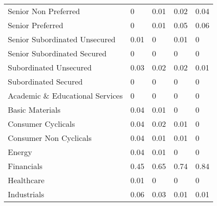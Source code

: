 \begin{table}[h!]
\begin{tabular}{lllll}
\cellcolor[HTML]{FFFFFF}Senior Non   Preferred & \cellcolor[HTML]{FCFCFF}0 & \cellcolor[HTML]{FBFCFE}0.01 & \cellcolor[HTML]{F9FBFC}0.02 & \cellcolor[HTML]{F5FAF9}0.04 \\
\cellcolor[HTML]{FFFFFF}Senior Preferred & \cellcolor[HTML]{FCFCFF}0 & \cellcolor[HTML]{FBFCFE}0.01 & \cellcolor[HTML]{F4F9F8}0.05 & \cellcolor[HTML]{F2F8F6}0.06 \\
\cellcolor[HTML]{FFFFFF}Senior   Subordinated Unsecured & \cellcolor[HTML]{FBFCFE}0.01 & \cellcolor[HTML]{FCFCFF}0 & \cellcolor[HTML]{FBFCFE}0.01 & \cellcolor[HTML]{FCFCFF}0 \\
\rowcolor[HTML]{FCFCFF} 
\cellcolor[HTML]{FFFFFF}Senior   Subordinated Secured & 0 & 0 & 0 & 0 \\
\cellcolor[HTML]{FFFFFF}Subordinated   Unsecured & \cellcolor[HTML]{F7FAFB}0.03 & \cellcolor[HTML]{F9FBFC}0.02 & \cellcolor[HTML]{F9FBFC}0.02 & \cellcolor[HTML]{FBFCFE}0.01 \\
\rowcolor[HTML]{FCFCFF} 
\cellcolor[HTML]{FFFFFF}Subordinated   Secured & 0 & 0 & 0 & 0 \\
\rowcolor[HTML]{FCFCFF} 
\cellcolor[HTML]{FFFFFF}Academic   \& Educational Services & 0 & 0 & 0 & 0 \\
\cellcolor[HTML]{FFFFFF}Basic Materials & \cellcolor[HTML]{F5FAF9}0.04 & \cellcolor[HTML]{FBFCFE}0.01 & \cellcolor[HTML]{FCFCFF}0 & \cellcolor[HTML]{FCFCFF}0 \\
\cellcolor[HTML]{FFFFFF}Consumer   Cyclicals & \cellcolor[HTML]{F5FAF9}0.04 & \cellcolor[HTML]{F9FBFC}0.02 & \cellcolor[HTML]{FBFCFE}0.01 & \cellcolor[HTML]{FCFCFF}0 \\
\cellcolor[HTML]{FFFFFF}Consumer   Non Cyclicals & \cellcolor[HTML]{F5FAF9}0.04 & \cellcolor[HTML]{FBFCFE}0.01 & \cellcolor[HTML]{FBFCFE}0.01 & \cellcolor[HTML]{FCFCFF}0 \\
\cellcolor[HTML]{FFFFFF}Energy & \cellcolor[HTML]{F5FAF9}0.04 & \cellcolor[HTML]{FBFCFE}0.01 & \cellcolor[HTML]{FCFCFF}0 & \cellcolor[HTML]{FCFCFF}0 \\
\cellcolor[HTML]{FFFFFF}Financials & \cellcolor[HTML]{ADDCBB}0.45 & \cellcolor[HTML]{8ACE9D}0.65 & \cellcolor[HTML]{7AC88F}0.74 & \cellcolor[HTML]{69C180}0.84 \\
\rowcolor[HTML]{FCFCFF} 
\cellcolor[HTML]{FFFFFF}Healthcare & \cellcolor[HTML]{FBFCFE}0.01 & 0 & 0 & 0 \\
\cellcolor[HTML]{FFFFFF}Industrials & \cellcolor[HTML]{F2F8F6}0.06 & \cellcolor[HTML]{F7FAFB}0.03 & \cellcolor[HTML]{FBFCFE}0.01 & \cellcolor[HTML]{FBFCFE}0.01 \\

\end{tabular}
\end{table}
